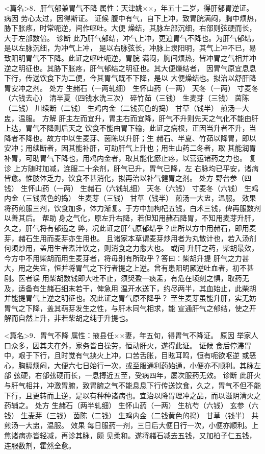 \documentclass[a4paper,12pt,UTF8,twoside]{ctexbook}
\begin{document}
<篇名>8．肝气郁兼胃气不降
属性：天津姚××，年五十二岁，得肝郁胃逆证。 
病因 劳心太过，因得斯证。 
证候 腹中有气，自下上冲，致胃脘满闷，胸中烦热，胁下胀疼，时常呃逆，间作呕吐。大便 
燥结，其脉左部沉细，右部则弦硬而长，大于左部数倍。 
诊断 此乃肝气郁结，冲气上冲，更迫胃气不降也。为肝气郁结，是以左脉沉细，为冲气上冲， 
是以右脉弦长，冲脉上隶阳明，其气上冲不已，易致阳明胃气不下降。此证之呕吐呃逆，胃脘 
满闷，胸间烦热，皆冲胃之气相并冲逆之明征也。其胁下胀疼，肝气郁结之明征也。其大便燥结者， 
因胃气原宜息息下行，传送饮食下为二便，今其胃气既不下降，是以 
大便燥结也。拟治以舒肝降胃安冲之剂。 
处方 生赭石（一两轧细） 生怀山药（一两） 天冬（一两） 寸麦冬（六钱去心） 
清半夏（四钱水洗三次） 碎竹茹（三钱） 生麦芽（三钱） 茵陈（二钱） 
川续断（二钱） 生鸡内金（二钱黄色的捣） 甘草（钱半） 
煎汤一大盅，温服。 
方解 肝主左而宜升，胃主右而宜降，肝气不升则先天之气化不能由肝上达，胃气不降则后天之 
饮食不能由胃下输，此证之病根，正因当升者不升，当降者不降也。故方中以生麦芽、茵陈以升肝；生 
赭石、半夏、竹茹以降胃，即以安冲；用续断者，因其能补肝，可助肝气上升也；用生山药二冬者，取 
其能润胃补胃，可助胃气下降也，用鸡内金者，取其能化瘀止疼，以营运诸药之力也。 
复诊 上方随时加减，连服二十余剂，肝气已升，胃气已降，左 
右脉均已平安，诸病皆愈。惟肢体乏力，饮食不甚消化，拟再治以补气健胃之剂。 
处方 野台参（四钱） 生怀山药（一两） 生赭石（六钱轧细） 天冬（六钱） 
寸麦冬（六钱） 生鸡内金（三钱黄色的捣） 生麦芽（三钱） 甘草（钱半） 
煎汤一大盅，温服。 
效果 将药煎服三剂，饮食加多，体力渐复。于方中加枸杞五钱，白术三钱，俾再服数剂以善其后。 
帮助 身之气化，原左升右降，若但知用赭石降胃，不知用麦芽升肝，久之，肝气将有郁遏之 
弊，况此证之肝气原郁结乎？此所以方中用赭石，即用麦芽，赭石生用而麦芽亦生用也。 
且诸家本草谓麦芽炒用者为丸散计也，若入汤剂何须炒用，盖用生者煮汁饮之，则消食之力愈大也。 
或问 升肝之药，柴胡最效，今方中不用柴胡而用生麦芽者，将毋别有所取乎？答曰∶柴胡升提 
肝气之力甚大，用之失宜，恒并将胃气之下行者提之上逆。曾有患阳明厥逆吐血者，初不甚剧。医者误 
用柴胡数钱即大吐不止，须臾盈一痰盂，有危在顷刻之惧，取药无及，适备有生赭石细末若干，俾急用 
温开水送下，约尽两半，其血始止，此柴胡并能提胃气上逆之明征也。况此证之胃气原不降乎？ 
至生麦芽虽能升肝，实无妨胃气之下降，盖其萌芽发生之性，与肝木同气相求，能 
宣通肝气之郁结，使之开解而自然上升，非若柴胡之纯于升提也。 


<篇名>9．胃气不降
属性：掖县任××妻，年五旬，得胃气不降证。 
原因 举家人口众多，因其夫在外，家务皆自操劳，恒动肝火，遂得此证。 
证候 食后停滞胃中，艰于下行，且时觉有气挟火上冲，口苦舌胀，目眩耳鸣，恒有呃欲呕逆 
或恶心，胸膈烦闷，大便六七日始行一次，或至服通利药始通，小便亦不顺利。其脉左部 
弦硬，右部弦硬而长，一息搏近五至，受病四年，屡次服药无效。 
诊断 此肝火与肝气相并，冲激胃腑，致胃腑之气不能息息下行传送饮食，久之，胃气不但不能 
下行，且更转而上逆，是以有种种诸病也。宜治以降胃理冲之品，而以滋阴清火之药辅之。 
处方 生赭石（两半轧细） 生怀山药（一两） 生杭芍（六钱） 玄参（六钱） 
生麦芽（三钱） 茵陈（二钱） 生鸡内金（二钱黄色的捣） 甘草（钱半） 
共煎汤一大盅，温服。 
效果 每日服药一剂，三日后大便日行一次，小便亦顺利。上焦诸病亦皆轻减，再诊其脉，颇 
见柔和。遂将赭石减去五钱，又加柏子仁五钱，连服数剂，霍然全愈。 
\end{document}
